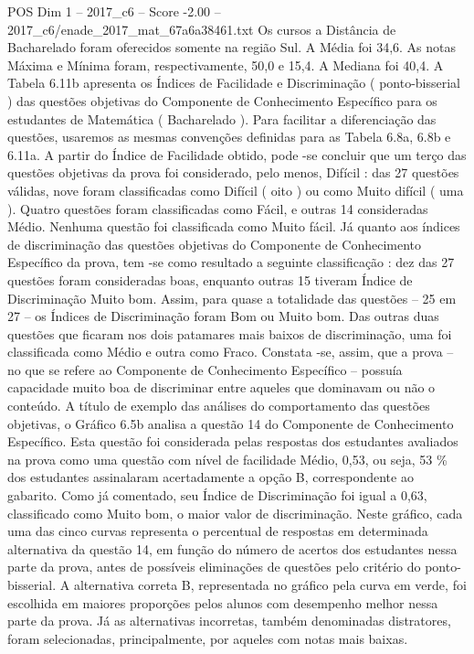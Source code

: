 \begin{textsample}{POS Dim 1 – 2017\_c6 – Score -2.00 – 2017\_c6/enade\_2017\_mat\_67a6a38461.txt}
Os cursos a Distância de Bacharelado foram oferecidos somente na região Sul.
A Média foi 34,6.
As notas Máxima e Mínima foram, respectivamente, 50,0 e 15,4.
A Mediana foi 40,4.
A Tabela 6.11b apresenta os Índices de Facilidade e Discriminação ( ponto-bisserial ) das questões objetivas do Componente de Conhecimento Específico para os estudantes de Matemática ( Bacharelado ).
Para facilitar a diferenciação das questões, usaremos as mesmas convenções definidas para as Tabela 6.8a, 6.8b e 6.11a.
A partir do Índice de Facilidade obtido, pode -se concluir que um terço das questões objetivas da prova foi considerado, pelo menos, Difícil : das 27 questões válidas, nove foram classificadas como Difícil ( oito ) ou como Muito difícil ( uma ).
Quatro questões foram classificadas como Fácil, e outras 14 consideradas Médio.
Nenhuma questão foi classificada como Muito fácil.
Já quanto aos índices de discriminação das questões objetivas do Componente de Conhecimento Específico da prova, tem -se como resultado a seguinte classificação : dez das 27 questões foram consideradas boas, enquanto outras 15 tiveram Índice de Discriminação Muito bom.
Assim, para quase a totalidade das questões – 25 em 27 – os Índices de Discriminação foram Bom ou Muito bom.
Das outras duas questões que ficaram nos dois patamares mais baixos de discriminação, uma foi classificada como Médio e outra como Fraco.
Constata -se, assim, que a prova – no que se refere ao Componente de Conhecimento Específico – possuía capacidade muito boa de discriminar entre aqueles que dominavam ou não o conteúdo.
A título de exemplo das análises do comportamento das questões objetivas, o Gráfico 6.5b analisa a questão 14 do Componente de Conhecimento Específico.
Esta questão foi considerada pelas respostas dos estudantes avaliados na prova como uma questão com nível de facilidade Médio, 0,53, ou seja, 53 \% dos estudantes assinalaram acertadamente a opção B, correspondente ao gabarito.
Como já comentado, seu Índice de Discriminação foi igual a 0,63, classificado como Muito bom, o maior valor de discriminação.
Neste gráfico, cada uma das cinco curvas representa o percentual de respostas em determinada alternativa da questão 14, em função do número de acertos dos estudantes nessa parte da prova, antes de possíveis eliminações de questões pelo critério do ponto-bisserial.
A alternativa correta B, representada no gráfico pela curva em verde, foi escolhida em maiores proporções pelos alunos com desempenho melhor nessa parte da prova.
Já as alternativas incorretas, também denominadas distratores, foram selecionadas, principalmente, por aqueles com notas mais baixas.

\end{textsample}
